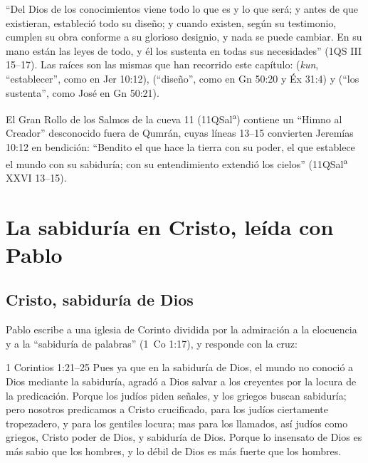 ``Del Dios de los conocimientos viene todo lo que es y lo que será; y antes de que existieran, estableció todo su diseño; y cuando existen, según su testimonio, cumplen su obra conforme a su glorioso designio, y nada se puede cambiar. En su mano están las leyes de todo, y él los sustenta en todas sus necesidades'' (1QS III 15--17). Las raíces son las mismas que han recorrido este capítulo:  (\emph{kun}, ``establecer'', como en Jer 10:12),  (``diseño'', como en Gn 50:20 y Éx 31:4) y  (``los sustenta'', como José en Gn 50:21).

El Gran Rollo de los Salmos de la cueva 11 (11QSal\textsuperscript{a}) contiene un ``Himno al Creador'' desconocido fuera de Qumrán, cuyas líneas 13--15 convierten Jeremías 10:12 en bendición: ``Bendito el que hace la tierra con su poder, el que establece el mundo con su sabiduría; con su entendimiento extendió los cielos'' (11QSal\textsuperscript{a} XXVI 13--15).


\section{La sabiduría en Cristo, leída con Pablo}\label{sec:cristo}

\subsection{Cristo, sabiduría de Dios}

Pablo escribe a una iglesia de Corinto dividida por la admiración a la elocuencia y a la ``sabiduría de palabras'' (1~Co 1:17), y responde con la cruz:

\begin{verso}{1 Corintios 1:21–25}
Pues ya que en la sabiduría de Dios, el mundo no conoció a Dios mediante la sabiduría, agradó a Dios salvar a los creyentes por la locura de la predicación. Porque los judíos piden señales, y los griegos buscan sabiduría; pero nosotros predicamos a Cristo crucificado, para los judíos ciertamente tropezadero, y para los gentiles locura; mas para los llamados, así judíos como griegos, Cristo poder de Dios, y sabiduría de Dios. Porque lo insensato de Dios es más sabio que los hombres, y lo débil de Dios es más fuerte que los hombres.
\end{verso}


